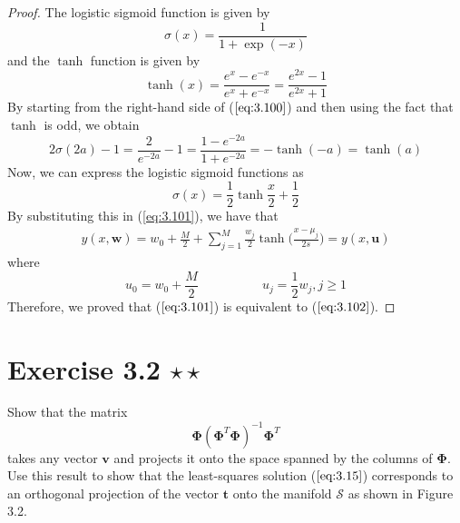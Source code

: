 \begin{proof}
    The logistic sigmoid function is given by
    \begin{equation*}
        \sigma(x) = \frac{1}{1 + \exp(-x)}
        \tag{3.6}\label{eq:3.6}
    \end{equation*}
    and the $\tanh$ function is given by
    \[
        \tanh(x) = \frac{e^x - e^{-x}}{e^x + e^{-x}} = \frac{e^{2x} - 1}{e^{2x} + 1}
    \] 
    By starting from the right-hand side of ($\ref{eq:3.100}$) and then 
    using the fact that $\tanh$ is odd, we obtain 
    \begin{equation*}\tag{3.100}
        2\sigma(2a) - 1 = \frac{2}{e^{-2a}} - 1 = \frac{1 - e^{-2a}}{1 + e^{-2a}}
        = -\tanh(-a) = \tanh(a)
    \end{equation*}
    Now, we can express the logistic sigmoid functions as
    \[
        \sigma(x) = \frac{1}{2}\tanh\frac{x}{2} + \frac{1}{2}
    \] 
    By substituting this in (\ref{eq:3.101}), we have that
    \begin{align*}
        y(x, \mathbf{w}) = w_0 + \frac{M}{2} +  
        \sum_{j=1}^{M} \frac{w_j}{2} \tanh\bigg(\frac{x - \mu_j}{2s}\bigg)
        = y(x, \mathbf{u})
    \end{align*}
    where
    \[
        u_0 = w_0 + \frac{M}{2} 
        \hspace{5em}
        u_j = \frac{1}{2} w_j, j \geq 1
    \] 
    Therefore, we proved that ($\ref{eq:3.101}$) is equivalent to ($\ref{eq:3.102}$).
\end{proof}

\section*{Exercise 3.2 $\star \star$}
Show that the matrix 
\begin{equation*}
    \mathbf{\Phi}(\mathbf{\Phi}^T\mathbf{\Phi})^{-1}\mathbf{\Phi}^T
    \tag{3.103}\label{eq:3.103}
\end{equation*}
takes any vector $\mathbf{v}$ and projects it onto the space spanned by the columns
of $\mathbf{\Phi}$. Use this result to show that the least-squares solution 
($\ref{eq:3.15}$) corresponds to an orthogonal projection of the vector $\mathbf{t}$ onto
the manifold $\mathcal{S}$ as shown in Figure 3.2.

\vspace{1em}

